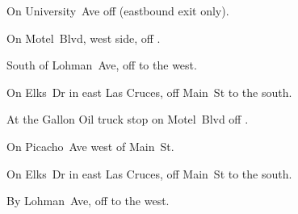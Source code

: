 
\begin{LocationList}

On University~Ave off   (eastbound exit only).

On  Motel~Blvd, west side, off  .

South of Lohman~Ave, off   to the west.

On Elks~Dr in east Las Cruces, off  Main~St to the south.

At the Gallon Oil truck stop on  Motel~Blvd off  .

\Location{\GarageHQ \Garage}
On  Picacho~Ave west of Main~St.

On Elks~Dr in east Las Cruces, off  Main~St to the south.

By Lohman~Ave, off   to the west.

\end{LocationList}
